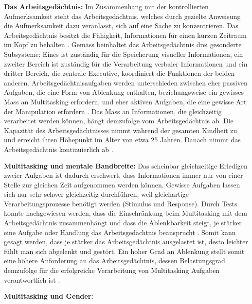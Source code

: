 \par
\textbf{Das Arbeitsgedächtnis:} Im Zusammenhang mit der kontrollierten Aufmerksamkeit steht das Arbeitsgedächtnis, welches durch gezielte Anweisung die Aufmerksamkeit dazu veranlasst, sich auf eine Sache zu konzentrieren. Das Arbeitsgedächtnis besitzt die Fähigkeit, Informationen für einen kurzen Zeitraum im Kopf zu behalten \cite{Klingberg2008}. Gemäss  beinhaltet das Arbeitsgedächtnis drei gesonderte Subsysteme: Eines ist zuständig für die Speicherung visueller Informationen, ein zweiter Bereich ist zuständig für die Verarbeitung verbaler Informationen und ein dritter Bereich, die zentrale Executive, koordiniert die Funktionen der beiden anderen. Arbeitsgedächtnisaufgaben werden unterschieden zwischen eher passiven Aufgaben, die eine Form von Ablenkung enthalten, beziehungsweise ein gewisses Mass an Multitasking erfordern, und eher aktiven Aufgaben, die eine gewisse Art der Manipulation erfordern \cite{Klingberg2008}. Das Mass an Informationen, die gleichzeitig verarbeitet werden können, hängt demzufolge vom Arbeitsgedächtnis ab. Die Kapazität des Arbeitsgedächtnisses nimmt während der gesamten Kindheit zu und erreicht ihren Höhepunkt im Alter von etwa 25 Jahren. Danach nimmt das Arbeitsgedächtnis kontinuierlich ab \cite{Swanson1999}.
\par  
\textbf{Multitasking und mentale Bandbreite:} Das scheinbar gleichzeitige Erledigen zweier Aufgaben ist dadurch erschwert, dass Informationen immer nur von einer Stelle zur gleichen Zeit aufgenommen werden können. Gewisse Aufgaben lassen sich nur sehr schwer gleichzeitig durchführen, weil gleichartige Verarbeitungsprozesse  benötigt werden (Stimulus und Response)\cite{Klingberg2008}. Durch Tests konnte nachgewiesen werden, dass die Einschränkung beim Multitasking mit dem Arbeitsgedächtnis zusammenhängt und dass die Ablenkbarkeit steigt, je stärker eine Aufgabe oder Handlung das Arbeitsgedächtnis beansprucht \cite{Lavie2005}. Somit kann gesagt werden, dass je stärker das Arbeitsgedächtnis ausgelastet ist, desto leichter fühlt man sich abgelenkt und gestört. Ein hoher Grad an Ablenkung stellt somit eine höhere Anforderung an das Arbeitsgedächtnis, dessen Belastungsgrad demzufolge für die erfolgreiche Verarbeitung von Multitasking Aufgaben verantwortlich ist \cite{Klingberg2008}.
\par
\textbf{Multitasking und Gender:}

